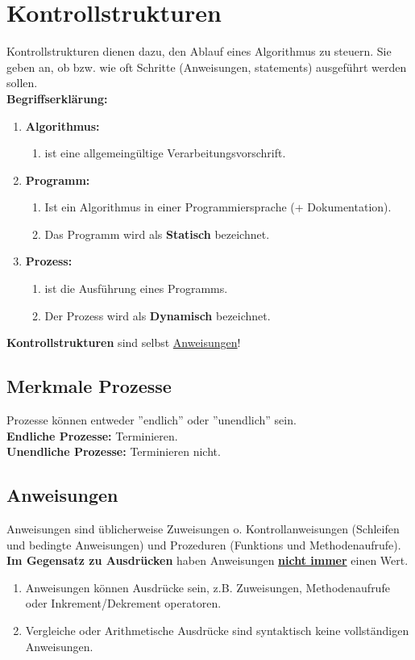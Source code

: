 \documentclass[12pt, a4paper]{article}
\begin{document}
\section*{Kontrollstrukturen}
Kontrollstrukturen dienen dazu, den Ablauf eines Algorithmus zu steuern. Sie geben an, ob bzw. wie oft Schritte (Anweisungen, statements) ausgeführt werden sollen. \vspace{0.5cm} \\
\textbf{Begriffserklärung:}
\begin{enumerate}[label=]
    \item \textbf{Algorithmus:}
    \begin{enumerate}[label=]
        \item ist eine allgemeingültige Verarbeitungsvorschrift.
    \end{enumerate}
    \item \textbf{Programm:}
    \begin{enumerate}[label=]
        \item Ist ein Algorithmus in einer Programmiersprache (+ Dokumentation).
        \item Das Programm wird als \textbf{Statisch} bezeichnet.
    \end{enumerate}
    \item \textbf{Prozess:}
    \begin{enumerate}[label=]
        \item ist die Ausführung eines Programms.
        \item Der Prozess wird als \textbf{Dynamisch} bezeichnet.
    \end{enumerate}
\end{enumerate}
\textbf{Kontrollstrukturen} sind selbst \underline{Anweisungen}!
\subsection*{Merkmale Prozesse}
Prozesse können entweder ''endlich'' oder ''unendlich'' sein. \vspace{0.5cm} \\
\textbf{Endliche Prozesse:} Terminieren.\\
\textbf{Unendliche Prozesse:} Terminieren nicht.
\subsection*{Anweisungen}
Anweisungen sind üblicherweise Zuweisungen o. Kontrollanweisungen (Schleifen und bedingte Anweisungen) und Prozeduren (Funktions und Methodenaufrufe). \vspace{0.5cm} \\
\textbf{Im Gegensatz zu Ausdrücken} haben Anweisungen \underline{\textbf{nicht immer}} einen Wert.
\begin{enumerate}
    \item Anweisungen können Ausdrücke sein, z.B. Zuweisungen, Methodenaufrufe oder Inkrement/Dekrement operatoren.
    \item Vergleiche oder Arithmetische Ausdrücke sind syntaktisch keine vollständigen Anweisungen.
\end{enumerate}
\newpage
\end{document}

